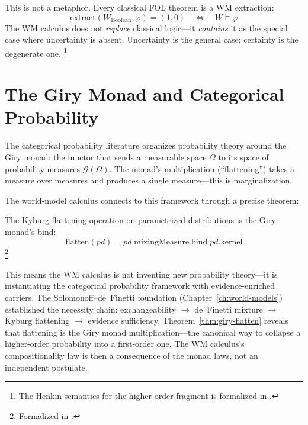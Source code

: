 \documentclass[11pt,openany]{report}
\begin{document}
This is not a metaphor.  Every classical FOL theorem is a WM
extraction:
\[
  \mathrm{extract}(W_{\mathrm{Boolean}}, \varphi) = (1, 0)
  \quad\Longleftrightarrow\quad
  W \vDash \varphi
\]
The WM calculus does not \emph{replace} classical logic---it
\emph{contains} it as the special case where uncertainty is absent.
Uncertainty is the general case; certainty is the degenerate one.%
\footnote{The Henkin semantics for the higher-order fragment is
formalized in
.}



\section{The Giry Monad and Categorical Probability}
\label{sec:bridge-giry}

The categorical probability literature organizes probability
theory around the Giry monad: the functor that sends a measurable
space $\Omega$ to its space of probability measures
$\mathcal{G}(\Omega)$.  The monad's multiplication
(``flattening'') takes a measure over measures and produces a
single measure---this is marginalization.

The world-model calculus connects to this framework through
a precise theorem:

\begin{theorem}[Kyburg flattening = Giry bind (\claimCore{})]
\label{thm:giry-flatten}
The Kyburg flattening operation on parametrized distributions
is the Giry monad's bind:
\[
  \mathrm{flatten}(\mathit{pd}) =
  \mathit{pd}.\mathrm{mixingMeasure}.\mathrm{bind}\;
  \mathit{pd}.\mathrm{kernel}
\]%
\footnote{Formalized in
.}
\end{theorem}

\noindent
This means the WM calculus is not inventing new probability
theory---it is instantiating the categorical probability framework
with evidence-enriched carriers.  The Solomonoff--de~Finetti
foundation (Chapter~\ref{ch:world-models}) established the
necessity chain: exchangeability $\to$ de~Finetti mixture $\to$
Kyburg flattening $\to$ evidence sufficiency.
Theorem~\ref{thm:giry-flatten} reveals that flattening is the
Giry monad multiplication---the canonical way to collapse a
higher-order probability into a first-order one.  The WM
calculus's compositionality law is then a consequence of the
monad laws, not an independent postulate.
\end{document}

